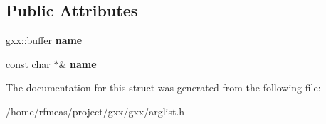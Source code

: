 \subsection*{Public Attributes}
\begin{DoxyCompactItemize}
\item 
\hyperlink{classgxx_1_1buffer}{gxx\+::buffer} {\bfseries name}\hypertarget{structgxx_1_1argname_a61e6b9fabe2b3bbf028ae077d37d341a}{}\label{structgxx_1_1argname_a61e6b9fabe2b3bbf028ae077d37d341a}

\item 
const char $\ast$\& {\bfseries name}\hypertarget{structgxx_1_1argname_a36fff5dfb197d024e9ff3312dcb3afa4}{}\label{structgxx_1_1argname_a36fff5dfb197d024e9ff3312dcb3afa4}

\end{DoxyCompactItemize}


The documentation for this struct was generated from the following file\+:\begin{DoxyCompactItemize}
\item 
/home/rfmeas/project/gxx/gxx/arglist.\+h\end{DoxyCompactItemize}
